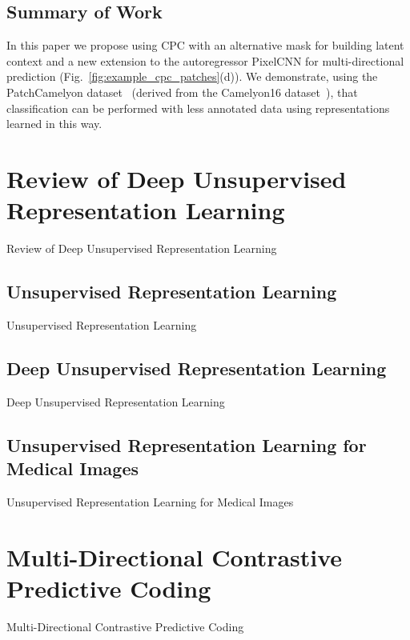 \subsection{Summary of Work}
\label{subsec:unsupervised_summary}
In this paper we propose using CPC with an alternative mask for building latent context and a new extension to the autoregressor PixelCNN for multi-directional prediction (Fig.~\ref{fig:example_cpc_patches}(d)). We demonstrate, using the PatchCamelyon dataset~\cite{veeling2018rotation} (derived from the Camelyon16 dataset~\cite{litjens20181399}), that classification can be performed with less annotated data using representations learned in this way.



\section{Review of Deep Unsupervised Representation Learning}
\label{sec:unsupervised_review}
Review of Deep Unsupervised Representation Learning

\subsection{Unsupervised Representation Learning}
\label{subsec:unsupervised_representation}
Unsupervised Representation Learning

\subsection{Deep Unsupervised Representation Learning}
\label{subsec:unsupervised_deep_representation}
Deep Unsupervised Representation Learning

\subsection{Unsupervised Representation Learning for Medical Images}
\label{subsec:unsupervise_representation_for_medical}
Unsupervised Representation Learning for Medical Images



\section{Multi-Directional Contrastive Predictive Coding}
\label{sec:unsupervised_multi_directional_cpc}
Multi-Directional Contrastive Predictive Coding

